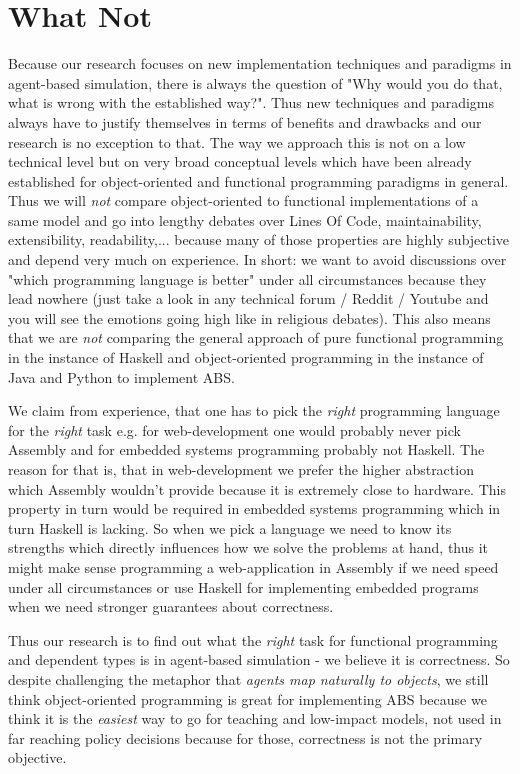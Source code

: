 \section{What Not}
Because our research focuses on new implementation techniques and paradigms in agent-based simulation, there is always the question of "Why would you do that, what is wrong with the established way?". Thus new techniques and paradigms always have to justify themselves in terms of benefits and drawbacks and our research is no exception to that. The way we approach this is not on a low technical level but on very broad conceptual levels which have been already established for object-oriented and functional programming paradigms in general. Thus we will \textit{not} compare object-oriented to functional implementations of a same model and go into lengthy debates over Lines Of Code, maintainability, extensibility, readability,... because many of those properties are highly subjective and depend very much on experience. In short: we want to avoid discussions over "which programming language is better" under all circumstances because they lead nowhere (just take a look in any technical forum / Reddit / Youtube and you will see the emotions going high like in religious debates). This also means that we are \textit{not} comparing the general approach of pure functional programming in the instance of Haskell and object-oriented programming in the instance of Java and Python to implement ABS.

We claim from experience, that one has to pick the \textit{right} programming language for the \textit{right} task e.g. for web-development one would probably never pick Assembly and for embedded systems programming probably not Haskell. The reason for that is, that in web-development we prefer the higher abstraction which Assembly wouldn't provide because it is extremely close to hardware. This property in turn would be required in embedded systems programming which in turn Haskell is lacking. So when we pick a language we need to know its strengths which directly influences how we solve the problems at hand, thus it might make sense programming a web-application in Assembly if we need speed under all circumstances or use Haskell for implementing embedded programs when we need stronger guarantees about correctness.

Thus our research is to find out what the \textit{right} task for functional programming and dependent types is in agent-based simulation - we believe it is correctness. So despite challenging the metaphor that \textit{agents map naturally to objects}, we still think object-oriented programming is great for implementing ABS because we think it is the \textit{easiest} way to go for teaching and low-impact models, not used in far reaching policy decisions because for those, correctness is not the primary objective.

